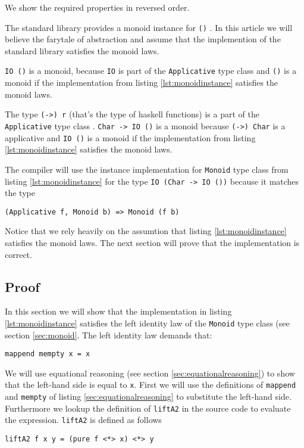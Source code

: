 We show the required properties in reversed order.

\begin{etaremune}
\item The standard library provides a monoid instance for \verb|()| \cite{monoid}. In this article we will believe the farytale of abstraction and assume that the implemention of the standard library satisfies the monoid laws.
\item \verb|IO ()| is a monoid, because \verb|IO| is part of the \verb|Applicative| type class \cite{control.applicative} and \verb|()| is a monoid if the implementation from listing \ref{lst:monoidinstance} satisfies the monoid laws.
\item The type \verb|(->) r| (that's the type of haskell functions) is a part of the \verb|Applicative| type class \cite{control.applicative}.
 \verb|Char -> IO ()| is a monoid because \verb|(->) Char| is a applicative and \verb|IO ()| is a monoid if the implementation from listing \ref{lst:monoidinstance} satisfies the monoid laws.
\item The compiler will use the instance implementation for \verb|Monoid| type class from listing \ref{lst:monoidinstance} for the type \verb|IO (Char -> IO ())| because it matches the type
\begin{verbatim}
(Applicative f, Monoid b) => Monoid (f b)
\end{verbatim}

\end{etaremune} 

Notice that we rely heavily on the assumtion that listing \ref{lst:monoidinstance} satisfies the monoid laws. The next section will prove that the implementation is correct.

\subsection{Proof}
\label{sec:exampleproof}

In this section we will show that the implementation in listing \ref{lst:monoidinstance} satisfies the left identity law of the \verb|Monoid| type class (see section \ref{sec:monoid}.
The left identity law demands that:
\begin{verbatim}
mappend mempty x = x
\end{verbatim}

We will use equational reasoning (see section \ref{sec:equationalreasoning}) to show that the left-hand side is equal to \verb|x|. First we will use the definitions of \verb|mappend| and \verb|mempty| of listing \ref{sec:equationalreasoning} to substitute the left-hand side. Furthermore we lookup the definition of \verb|liftA2| in the source code \cite{control.applicative} to evaluate the expression. 
\verb|liftA2| is defined as follows
\begin{verbatim}
liftA2 f x y = (pure f <*> x) <*> y
\end{verbatim}

